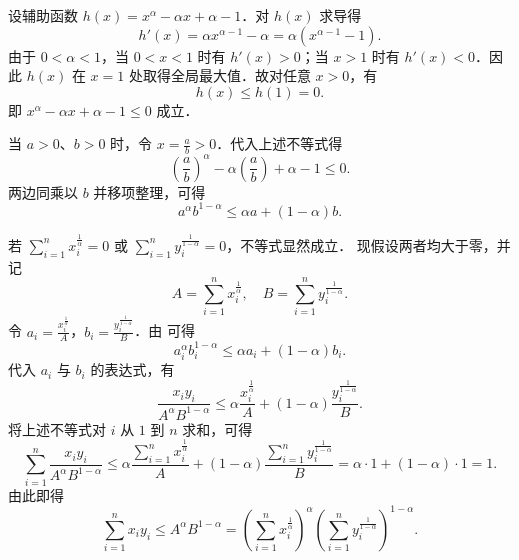 \begin{myproof}

    设辅助函数 $h(x) = x^{\alpha} - \alpha x + \alpha - 1$．对 $h(x)$ 求导得
    \begin{equation}\label{eq:sol1-deriv}
        h'(x) = \alpha x^{\alpha-1} - \alpha = \alpha \left( x^{\alpha-1} - 1 \right).
    \end{equation}
    由于 $0 < \alpha < 1$，当 $0 < x < 1$ 时有 $h'(x) > 0$；当 $x > 1$ 时有 $h'(x) < 0$．因此 $h(x)$ 在 $x = 1$ 处取得全局最大值．故对任意 $x > 0$，有
    \begin{equation}\label{eq:sol1-max}
        h(x) \leqslant h(1) = 0.
    \end{equation}
    即 $x^{\alpha} - \alpha x + \alpha - 1 \leqslant 0$ 成立．

    当 $a > 0$、$b > 0$ 时，令 $x = \frac{a}{b} > 0$．代入上述不等式得
    \begin{equation}\label{eq:sol1-sub}
        \left( \frac{a}{b} \right)^{\alpha} - \alpha \left( \frac{a}{b} \right) + \alpha - 1 \leqslant 0.
    \end{equation}
    两边同乘以 $b$ 并移项整理，可得
    \begin{equation}\label{eq:sol1-final}
        a^{\alpha} b^{1-\alpha} \leqslant \alpha a + (1-\alpha) b.
    \end{equation}


    若 $\sum_{i=1}^n x_i^{\frac{1}{\alpha}} = 0$ 或 $\sum_{i=1}^n y_i^{\frac{1}{1-\alpha}} = 0$，不等式显然成立．
    现假设两者均大于零，并记
    \begin{equation}\label{eq:sol2-norms}
        A = \sum_{i=1}^n x_i^{\frac{1}{\alpha}}, \quad B = \sum_{i=1}^n y_i^{\frac{1}{1-\alpha}}.
    \end{equation}
    令 $a_i = \frac{x_i^{\frac{1}{\alpha}}}{A}$，$b_i = \frac{y_i^{\frac{1}{1-\alpha}}}{B}$．由  可得
    \begin{equation}\label{eq:sol2-sub}
        a_i^{\alpha} b_i^{1-\alpha} \leqslant \alpha a_i + (1-\alpha) b_i.
    \end{equation}
    代入 $a_i$ 与 $b_i$ 的表达式，有
    \begin{equation}\label{eq:sol2-elem}
        \frac{x_i y_i}{A^{\alpha} B^{1-\alpha}} \leqslant \alpha \frac{x_i^{\frac{1}{\alpha}}}{A} + (1-\alpha) \frac{y_i^{\frac{1}{1-\alpha}}}{B}.
    \end{equation}
    将上述不等式对 $i$ 从 $1$ 到 $n$ 求和，可得
    \begin{equation}\label{eq:sol2-sum}
        \sum_{i=1}^n \frac{x_i y_i}{A^{\alpha} B^{1-\alpha}} \leqslant \alpha \frac{\sum_{i=1}^n x_i^{\frac{1}{\alpha}}}{A} + (1-\alpha) \frac{\sum_{i=1}^n y_i^{\frac{1}{1-\alpha}}}{B} = \alpha \cdot 1 + (1-\alpha) \cdot 1 = 1.
    \end{equation}
    由此即得
    \begin{equation}\label{eq:sol2-final}
        \sum_{i=1}^n x_i y_i \leqslant A^{\alpha} B^{1-\alpha} = \left( \sum_{i=1}^n x_i^{\frac{1}{\alpha}} \right)^{\alpha} \left( \sum_{i=1}^n y_i^{\frac{1}{1-\alpha}} \right)^{1-\alpha}.
    \end{equation}


\end{myproof}
